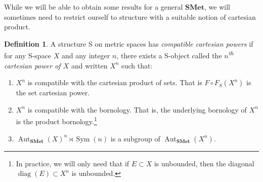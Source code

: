 \documentclass[a4paper]{article}
\theoremstyle{definition}
\newtheorem{defn}[lem]{Definition}
\DeclareMathOperator\Sym{Sym}
\DeclareMathOperator\diag{diag}
\DeclareMathOperator\Aut{Aut}
\DeclareMathOperator\id{id}
\newcommand*{\orbite}{\mathcal O}
\begin{document}
While we will be able to obtain some results for a general $\mathbf{SMet}$, we will sometimes need to restrict ourself to structure with a suitable notion of cartesian product.
%
%
\begin{defn}\label{Def:Cartesian}
A structure S on metric spaces has \emph{compatible cartesian powers} if for any S-space $X$ and any integer $n$, there exists a S-object called the \emph{$n$\textsuperscript{th} cartesian power of $X$} and written $X^n$ such that:
\begin{enumerate}
\item
$X^n$ is compatible with the cartesian product of sets. That is $F\circ F_S(X^n)$ is the set cartesian power. %
\item\label{Condidef:2}
$X^n$ is compatible with the bornology. That is, the underlying bornology of $X^n$ is the product bornology.\footnote{In practice, we will only need that if $E\subset X$ is unbounded, then the diagonal $\diag(E)\subset X^n$ is unbounded.}
\item\label{Item:Product}
$\Aut_{\mathbf{SMet}}(X)^n\rtimes \Sym(n)$ is a subgroup of $\Aut_{\mathbf{SMet}}(X^n)$.
\end{enumerate}
%
\end{defn}
\end{document}
